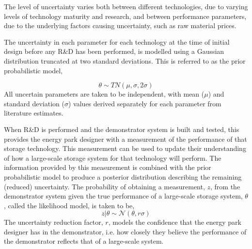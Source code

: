 The level of uncertainty varies both between different technologies, due to varying levels of technology maturity and research, and between performance parameters, due to the underlying factors causing uncertainty, such as raw material prices. %

The uncertainty in each parameter for each technology at the time of initial design before any R\&D has been performed, is modelled using a Gaussian distribution truncated at two standard deviations. This is referred to as the prior probabilistic model,

\begin{equation} \label{eq:parks-prior}
    \theta \sim TN\left(\mu,\sigma,2\sigma\right)
\end{equation}
All uncertain parameters are taken to be independent, with mean ($\mu$) and standard deviation ($\sigma$) values derived separately for each parameter from literature estimates. %

When R\&D is performed and the demonstrator system is built and tested, this provides the energy park designer with a measurement of the performance of that storage technology. This measurement can be used to update their understanding of how a large-scale storage system for that technology will perform. The information provided by this measurement is combined with the prior probabilistic model to produce a posterior distribution describing the remaining (reduced) uncertainty.
The probability of obtaining a measurement, $z$, from the demonstrator system given the true performance of a large-scale storage system, $\theta$, called the likelihood model, is taken to be,
\begin{equation} \label{eq:parks-measurement}
    z|\theta \sim \mathcal{N}\left(\theta,r\sigma\right)
\end{equation}
The uncertainty reduction factor, $r$, models the confidence that the energy park designer has in the demonstrator, i.e. how closely they believe the performance of the demonstrator reflects that of a large-scale system. \\

